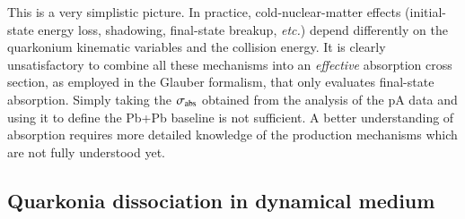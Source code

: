 This is a very simplistic picture. In practice, cold-nuclear-matter effects 
(initial-state energy loss, shadowing, final-state breakup, {\it etc.}) 
depend differently on the quarkonium kinematic variables and the collision energy. 
It is clearly unsatisfactory to combine all these mechanisms into an {\it effective} 
absorption cross section, as employed in the Glauber formalism, 
that only evaluates final-state absorption. 
Simply taking the $\sigma_{\rm abs}$ obtained from 
the analysis of the pA data 
and using it to define the Pb+Pb baseline is not sufficient. 
A better understanding of absorption requires more detailed knowledge of the 
production mechanisms which are not fully understood yet.






\subsection{Quarkonia dissociation in dynamical medium}


